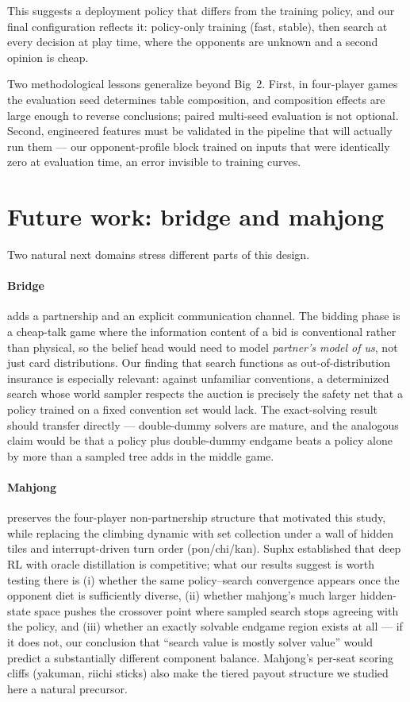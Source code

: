 \documentclass[11pt]{article}
\begin{document}
This suggests a deployment policy that differs from the training
policy, and our final configuration reflects it: policy-only training
(fast, stable), then search at every decision at play time, where the
opponents are unknown and a second opinion is cheap.

Two methodological lessons generalize beyond Big~2. First, in
four-player games the evaluation seed determines table composition, and
composition effects are large enough to reverse conclusions; paired
multi-seed evaluation is not optional. Second, engineered features must
be validated in the pipeline that will actually run them --- our
opponent-profile block trained on inputs that were identically zero at
evaluation time, an error invisible to training curves.

\section{Future work: bridge and mahjong}

Two natural next domains stress different parts of this design.

\paragraph{Bridge} adds a partnership and an explicit communication
channel. The bidding phase is a cheap-talk game where the information
content of a bid is conventional rather than physical, so the
belief head would need to model \emph{partner's model of us}, not just
card distributions. Our finding that search functions as
out-of-distribution insurance is especially relevant: against
unfamiliar conventions, a determinized search whose world sampler
respects the auction is precisely the safety net that a policy trained
on a fixed convention set would lack. The exact-solving result should
transfer directly --- double-dummy solvers are mature, and the
analogous claim would be that a policy plus double-dummy endgame beats
a policy alone by more than a sampled tree adds in the middle game.

\paragraph{Mahjong} preserves the four-player non-partnership structure
that motivated this study, while replacing the climbing dynamic with
set collection under a wall of hidden tiles and interrupt-driven turn
order (pon/chi/kan). Suphx \citep{li2020} established that deep RL with
oracle distillation is competitive; what our results suggest is worth
testing there is (i) whether the same policy--search convergence
appears once the opponent diet is sufficiently diverse, (ii) whether
mahjong's much larger hidden-state space pushes the crossover point
where sampled search stops agreeing with the policy, and (iii) whether
an exactly solvable endgame region exists at all --- if it does not,
our conclusion that ``search value is mostly solver value'' would
predict a substantially different component balance. Mahjong's
per-seat scoring cliffs (yakuman, riichi sticks) also make the tiered
payout structure we studied here a natural precursor.
\end{document}
